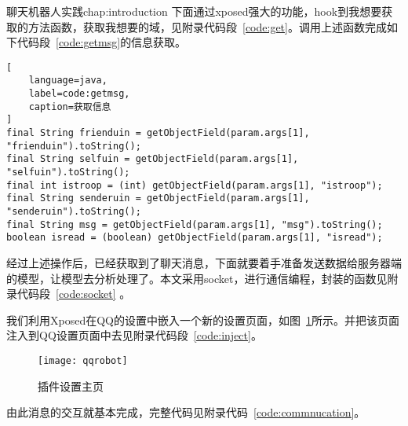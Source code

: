 \begin{cuzchapter}{聊天机器人实践}{chap:introduction}
下面通过xposed强大的功能，hook到我想要获取的方法函数，获取我想要的域，见附录代码段~\ref{code:get}。调用上述函数完成如下代码段~\ref{code:getmsg}的信息获取。
\begin{lstlisting}[
    language=java,
    label=code:getmsg,
    caption=获取信息
]
final String frienduin = getObjectField(param.args[1], "frienduin").toString();
final String selfuin = getObjectField(param.args[1], "selfuin").toString();
final int istroop = (int) getObjectField(param.args[1], "istroop");
final String senderuin = getObjectField(param.args[1], "senderuin").toString();
final String msg = getObjectField(param.args[1], "msg").toString();
boolean isread = (boolean) getObjectField(param.args[1], "isread");
\end{lstlisting}

经过上述操作后，已经获取到了聊天消息，下面就要着手准备发送数据给服务器端的模型，让模型去分析处理了。本文采用socket，进行通信编程，封装的函数见附录代码段~\ref{code:socket} 。

我们利用Xposed在QQ的设置中嵌入一个新的设置页面，如图~\ref{qqrobot}所示。并把该页面注入到QQ设置页面中去见附录代码段~\ref{code:inject}。
\begin{figure}[!htbp]
    \centering
    \texttt{[image: qqrobot]}
    \caption[qqrobot]{插件设置主页}
    \label{qqrobot}
\end{figure}

由此消息的交互就基本完成，完整代码见附录代码~\ref{code:commnucation}。
\end{cuzchapter}
